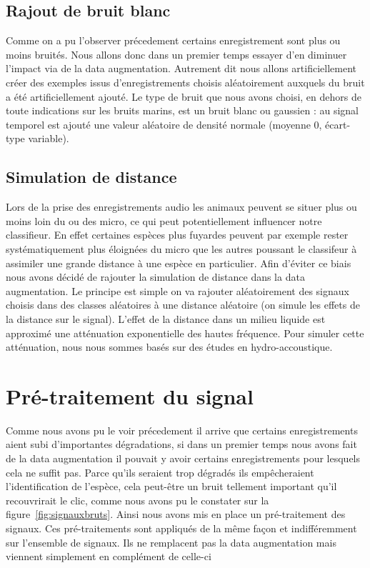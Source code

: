 \hypertarget{Rajout-de-bruit-blanc}{%
\subsection{Rajout de bruit blanc}
\label{Rajout-de-bruit-blanc}}

Comme on a pu l'observer précedement certains enregistrement sont plus ou moins bruités.
Nous allons donc dans un premier temps essayer d'en diminuer l'impact via de la data augmentation. Autrement dit nous allons artificiellement créer des exemples issus d'enregistrements choisis aléatoirement auxquels du bruit a été artificiellement ajouté.
Le type de bruit que nous avons choisi, en dehors de toute indications sur les bruits marins, est un bruit blanc ou gaussien : au signal temporel est ajouté une valeur aléatoire de densité normale (moyenne 0, écart-type variable).

\hypertarget{Simulation-de-distance}{%
\subsection{Simulation de distance}
\label{Simulation-de-distance}}

Lors de la prise des enregistrements audio les animaux peuvent se situer plus ou moins loin du ou des micro, ce qui peut potentiellement influencer notre classifieur.
En effet certaines espèces plus fuyardes peuvent par exemple rester systématiquement plus
éloignées du micro que les autres poussant le classifeur à assimiler
une grande distance à une espèce en particulier.
Afin d'éviter ce biais nous avons décidé de rajouter la simulation de distance dans la data augmentation.
Le principe est simple on va rajouter aléatoirement des signaux choisis dans des classes aléatoires à une distance aléatoire (on simule les effets de la distance sur le signal).
L'effet de la distance dans un milieu liquide est approximé une atténuation exponentielle des hautes fréquence.
Pour simuler cette atténuation, nous nous sommes basés sur des études en hydro-accoustique.

\hypertarget{Traitement-du-signal}{%
\section{Pré-traitement du signal}
\label{Traitement-du-signal}}

Comme nous avons pu le voir précedement il arrive que certains enregistrements aient subi d'importantes dégradations, si dans un premier temps nous avons fait de la data augmentation il pouvait y avoir certains enregistrements pour lesquels cela ne suffit pas.
Parce qu'ils seraient trop dégradés ils empêcheraient l'identification de l'espèce, cela peut-être un bruit tellement important qu'il recouvrirait le clic, comme nous avons pu le constater sur la figure~\ref{fig:signauxbruts}.
Ainsi nous avons mis en place un pré-traitement des signaux.
Ces pré-traitements sont appliqués de la même façon et indifféremment sur l'ensemble de signaux.
Ils ne remplacent pas la data augmentation mais viennent simplement en complément de celle-ci

